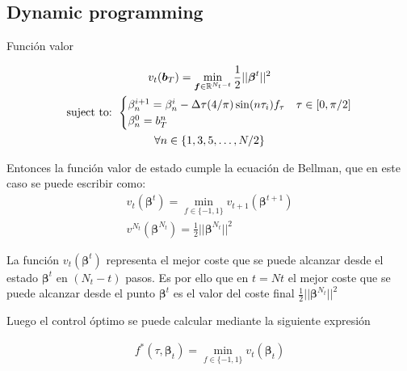 \subsection{Dynamic programming}

Función valor 

\begin{gather}
    v_t(\bm{b}_T) =  \min_{\bm{f} \in \mathbb{R}^{N_t-t} } \frac{1}{2}||\bm{\beta}^{t}||^2 \\
    \text{suject to: }
    \begin{cases}
        \beta_n^{i+1} = \beta_n^{i} - \Delta \tau (4/\pi) \sin(n\tau_i) f_\tau & \tau \in [0,\pi/2]\label{dyn}\\
        \beta_n^0 = b_T^n
    \end{cases} \\
    \notag \forall n \in \{1,3,5,\dots,N/2 \}
\end{gather}




Entonces la función valor de estado cumple la ecuación de Bellman, que en este caso se puede escribir como:
\begin{gather}\label{BellmanEquationOptimo}
    v_t(\bm{\beta}^t) = \min_{f \in \{ -1,1 \}}  v_{t+1}(\bm{\beta}^{t+1})  \\
    v^{N_t}(\bm{\beta}^{N_t}) =  \frac{1}{2}|| \bm{\beta}^{N_t}||^2
\end{gather}

La función $v_t(\bm{\beta}^t)$ representa el mejor coste que se puede alcanzar desde el estado $\bm{\beta}^t$ en $(N_t-t)$ pasos. Es por ello que en $t=Nt$ el mejor coste que se puede alcanzar desde el punto $\bm{\beta}^t$ es el valor del coste final $\frac{1}{2} || \bm{\beta}^{N_t}||^2$


Luego el control óptimo se puede calcular mediante la siguiente expresión 

\begin{gather}
    f^*(\tau,\bm{\beta}_t) = \min_{f \in \{ -1,1\}} v_t(\bm{\beta}_t)
\end{gather}

